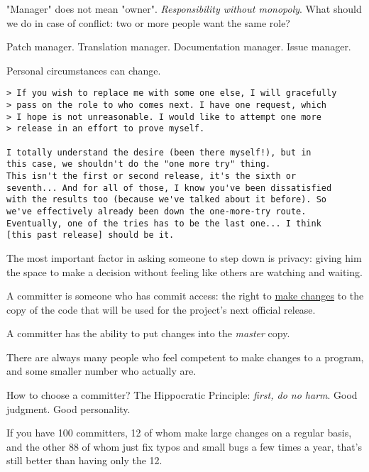 \documentclass[landscape,30pt]{foils}
\begin{document}
"Manager" does not mean "owner".  {\em Responsibility without monopoly}.  What should we do in case of conflict: two or more people want the same role?

Patch manager. Translation manager.  Documentation manager.  Issue manager.     



Personal circumstances can change.

{\tiny
\begin{verbatim}
> If you wish to replace me with some one else, I will gracefully
> pass on the role to who comes next. I have one request, which
> I hope is not unreasonable. I would like to attempt one more
> release in an effort to prove myself.

I totally understand the desire (been there myself!), but in
this case, we shouldn't do the "one more try" thing.
This isn't the first or second release, it's the sixth or
seventh... And for all of those, I know you've been dissatisfied
with the results too (because we've talked about it before). So
we've effectively already been down the one-more-try route.
Eventually, one of the tries has to be the last one... I think
[this past release] should be it.
\end{verbatim}
}

The most important factor in asking someone to step down is privacy: giving him the space to make a
decision without feeling like others are watching and waiting.



A committer is someone who has commit access: the right to \underline{make changes} to the copy of the code that will be used for the project's next official release.

A committer has the ability to put changes into the {\em master} copy.

There are always many people who feel competent to make changes to a program, and some smaller number who actually are.

How to choose a committer?  The Hippocratic Principle: {\em first, do no harm}.  Good judgment.  Good personality.

If you have 100 committers, 12 of whom make large changes on a regular basis, and the other 88 of whom just fix typos and small bugs a few times a year, that's still better than having only the 12.
\end{document}
